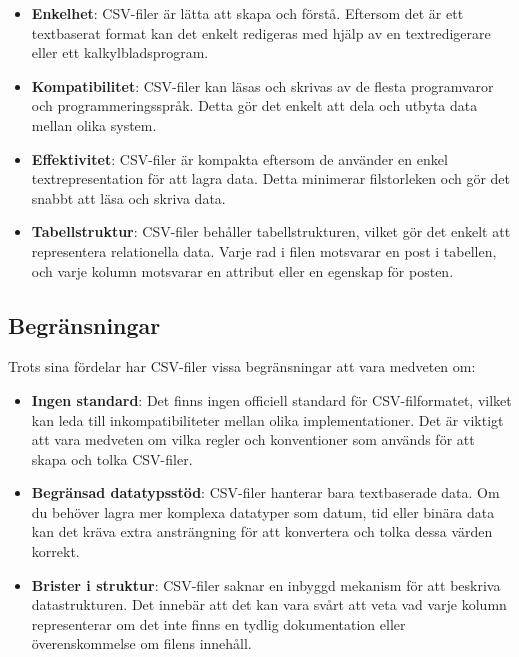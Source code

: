 \begin{itemize}
\tightlist
\item
  \textbf{Enkelhet}: CSV-filer är lätta att skapa och förstå. Eftersom
  det är ett textbaserat format kan det enkelt redigeras med hjälp av en
  textredigerare eller ett kalkylbladsprogram.
\item
  \textbf{Kompatibilitet}: CSV-filer kan läsas och skrivas av de flesta
  programvaror och programmeringsspråk. Detta gör det enkelt att dela
  och utbyta data mellan olika system.
\item
  \textbf{Effektivitet}: CSV-filer är kompakta eftersom de använder en
  enkel textrepresentation för att lagra data. Detta minimerar
  filstorleken och gör det snabbt att läsa och skriva data.
\item
  \textbf{Tabellstruktur}: CSV-filer behåller tabellstrukturen, vilket
  gör det enkelt att representera relationella data. Varje rad i filen
  motsvarar en post i tabellen, och varje kolumn motsvarar en attribut
  eller en egenskap för posten.
\end{itemize}

\hypertarget{begruxe4nsningar}{%
\subsection{Begränsningar}\label{begruxe4nsningar}}

Trots sina fördelar har CSV-filer vissa begränsningar att vara medveten
om:

\begin{itemize}
\tightlist
\item
  \textbf{Ingen standard}: Det finns ingen officiell standard för
  CSV-filformatet, vilket kan leda till inkompatibiliteter mellan olika
  implementationer. Det är viktigt att vara medveten om vilka regler och
  konventioner som används för att skapa och tolka CSV-filer.
\item
  \textbf{Begränsad datatypsstöd}: CSV-filer hanterar bara textbaserade
  data. Om du behöver lagra mer komplexa datatyper som datum, tid eller
  binära data kan det kräva extra ansträngning för att konvertera och
  tolka dessa värden korrekt.
\item
  \textbf{Brister i struktur}: CSV-filer saknar en inbyggd mekanism för
  att beskriva datastrukturen. Det innebär att det kan vara svårt att
  veta vad varje kolumn representerar om det inte finns en tydlig
  dokumentation eller överenskommelse om filens innehåll.
\end{itemize}

